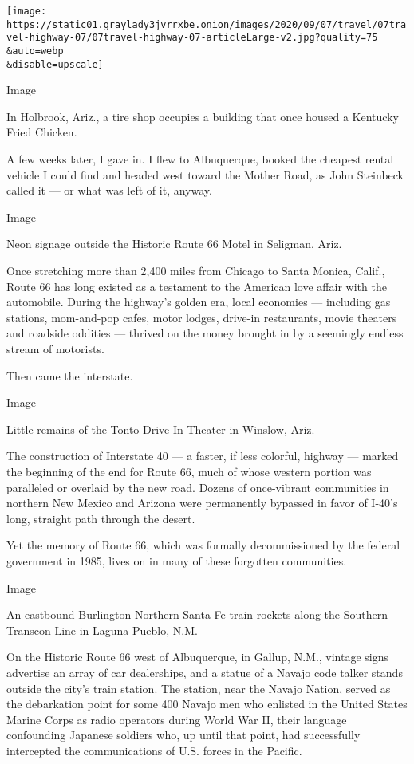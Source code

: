 \texttt{[image: https://static01.graylady3jvrrxbe.onion/images/2020/09/07/travel/07travel-highway-07/07travel-highway-07-articleLarge-v2.jpg?quality=75\\\&auto=webp\\\&disable=upscale]}

Image

In Holbrook, Ariz., a tire shop occupies a building that once housed a
Kentucky Fried Chicken.

A few weeks later, I gave in. I flew to Albuquerque, booked the cheapest
rental vehicle I could find and headed west toward the Mother Road, as
John Steinbeck called it --- or what was left of it, anyway.

Image

Neon signage outside the Historic Route 66 Motel in Seligman, Ariz.

Once stretching more than 2,400 miles from Chicago to Santa Monica,
Calif., Route 66 has long existed as a testament to the American love
affair with the automobile. During the highway's golden era, local
economies --- including gas stations, mom-and-pop cafes, motor lodges,
drive-in restaurants, movie theaters and roadside oddities --- thrived
on the money brought in by a seemingly endless stream of motorists.

Then came the interstate.

Image

Little remains of the Tonto Drive-In Theater in Winslow, Ariz.

The construction of Interstate 40 --- a faster, if less colorful,
highway --- marked the beginning of the end for Route 66, much of whose
western portion was paralleled or overlaid by the new road. Dozens of
once-vibrant communities in northern New Mexico and Arizona were
permanently bypassed in favor of I-40's long, straight path through the
desert.

Yet the memory of Route 66, which was formally decommissioned by the
federal government in 1985, lives on in many of these forgotten
communities.

Image

An eastbound Burlington Northern Santa Fe train rockets along the
Southern Transcon Line in Laguna Pueblo, N.M.

On the Historic Route 66 west of Albuquerque, in Gallup, N.M., vintage
signs advertise an array of car dealerships, and a statue of a Navajo
code talker stands outside the city's train station. The station, near
the Navajo Nation, served as the debarkation point for some 400 Navajo
men who enlisted in the United States Marine Corps as radio operators
during World War II, their language confounding Japanese soldiers who,
up until that point, had successfully intercepted the communications of
U.S. forces in the Pacific.

